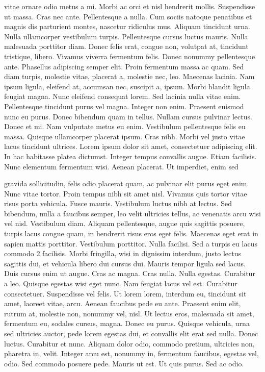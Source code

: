 \documentclass{article}
\begin{document}
vitae ornare odio metus a mi. Morbi ac orci et nisl hendrerit mollis. Suspendisse
ut massa. Cras nec ante. Pellentesque a nulla. Cum sociis natoque penatibus et
magnis dis parturient montes, nascetur ridiculus mus. Aliquam tincidunt urna.
Nulla ullamcorper vestibulum turpis. Pellentesque cursus luctus mauris.
Nulla malesuada porttitor diam. Donec felis erat, congue non, volutpat at,
tincidunt tristique, libero. Vivamus viverra fermentum felis. Donec nonummy
pellentesque ante. Phasellus adipiscing semper elit. Proin fermentum massa
ac quam. Sed diam turpis, molestie vitae, placerat a, molestie nec, leo. Maecenas lacinia. Nam ipsum ligula, eleifend at, accumsan nec, suscipit a, ipsum.
Morbi blandit ligula feugiat magna. Nunc eleifend consequat lorem. Sed lacinia
nulla vitae enim. Pellentesque tincidunt purus vel magna. Integer non enim.
Praesent euismod nunc eu purus. Donec bibendum quam in tellus. Nullam cursus pulvinar lectus. Donec et mi. Nam vulputate metus eu enim. Vestibulum
pellentesque felis eu massa.
Quisque ullamcorper placerat ipsum. Cras nibh. Morbi vel justo vitae lacus
tincidunt ultrices. Lorem ipsum dolor sit amet, consectetuer adipiscing elit. In
hac habitasse platea dictumst. Integer tempus convallis augue. Etiam facilisis.
Nunc elementum fermentum wisi. Aenean placerat. Ut imperdiet, enim sed

gravida sollicitudin, felis odio placerat quam, ac pulvinar elit purus eget enim.
Nunc vitae tortor. Proin tempus nibh sit amet nisl. Vivamus quis tortor vitae
risus porta vehicula.
Fusce mauris. Vestibulum luctus nibh at lectus. Sed bibendum, nulla a faucibus semper, leo velit ultricies tellus, ac venenatis arcu wisi vel nisl. Vestibulum
diam. Aliquam pellentesque, augue quis sagittis posuere, turpis lacus congue
quam, in hendrerit risus eros eget felis. Maecenas eget erat in sapien mattis
porttitor. Vestibulum porttitor. Nulla facilisi. Sed a turpis eu lacus commodo
2
facilisis. Morbi fringilla, wisi in dignissim interdum, justo lectus sagittis dui, et
vehicula libero dui cursus dui. Mauris tempor ligula sed lacus. Duis cursus enim
ut augue. Cras ac magna. Cras nulla. Nulla egestas. Curabitur a leo. Quisque
egestas wisi eget nunc. Nam feugiat lacus vel est. Curabitur consectetuer.
Suspendisse vel felis. Ut lorem lorem, interdum eu, tincidunt sit amet, laoreet vitae, arcu. Aenean faucibus pede eu ante. Praesent enim elit, rutrum at,
molestie non, nonummy vel, nisl. Ut lectus eros, malesuada sit amet, fermentum
eu, sodales cursus, magna. Donec eu purus. Quisque vehicula, urna sed ultricies
auctor, pede lorem egestas dui, et convallis elit erat sed nulla. Donec luctus.
Curabitur et nunc. Aliquam dolor odio, commodo pretium, ultricies non, pharetra in, velit. Integer arcu est, nonummy in, fermentum faucibus, egestas vel,
odio.
Sed commodo posuere pede. Mauris ut est. Ut quis purus. Sed ac odio. 
\end{document}

